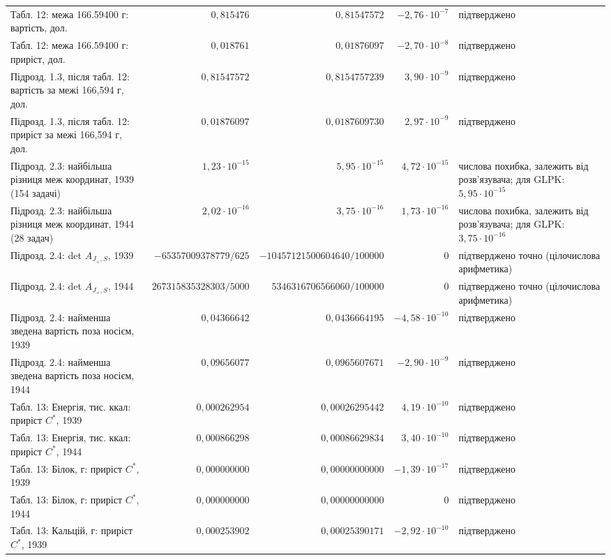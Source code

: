 {\begin{longtable}{>{\raggedright}p{4.3cm}rrr>{\raggedright\arraybackslash}p{2.3cm}}
Табл. 12: межа 166.59400 г: вартість, дол. & $0{,}815476$ & $0{,}81547572$ & $-2{,}76\cdot10^{-7}$ & підтверджено \\
Табл. 12: межа 166.59400 г: приріст, дол. & $0{,}018761$ & $0{,}01876097$ & $-2{,}70\cdot10^{-8}$ & підтверджено \\
Підрозд. 1.3, після табл. 12: вартість за межі 166{,}594 г, дол. & $0{,}81547572$ & $0{,}8154757239$ & $3{,}90\cdot10^{-9}$ & підтверджено \\
Підрозд. 1.3, після табл. 12: приріст за межі 166{,}594 г, дол. & $0{,}01876097$ & $0{,}0187609730$ & $2{,}97\cdot10^{-9}$ & підтверджено \\
Підрозд. 2.3: найбільша різниця меж координат, 1939 (154 задачі) & $1{,}23\cdot10^{-15}$ & $5{,}95\cdot10^{-15}$ & $4{,}72\cdot10^{-15}$ & числова похибка, залежить від розв’язувача; для GLPK: $5{,}95\cdot10^{-15}$ \\
Підрозд. 2.3: найбільша різниця меж координат, 1944 (28 задач) & $2{,}02\cdot10^{-16}$ & $3{,}75\cdot10^{-16}$ & $1{,}73\cdot10^{-16}$ & числова похибка, залежить від розв’язувача; для GLPK: $3{,}75\cdot10^{-16}$ \\
Підрозд. 2.4: det $A_{J_+,S}$, 1939 & $-65357009378779/625$ & $-10457121500604640/100000$ & $0$ & підтверджено точно (цілочислова арифметика) \\
Підрозд. 2.4: det $A_{J_+,S}$, 1944 & $267315835328303/5000$ & $5346316706566060/100000$ & $0$ & підтверджено точно (цілочислова арифметика) \\
Підрозд. 2.4: найменша зведена вартість поза носієм, 1939 & $0{,}04366642$ & $0{,}0436664195$ & $-4{,}58\cdot10^{-10}$ & підтверджено \\
Підрозд. 2.4: найменша зведена вартість поза носієм, 1944 & $0{,}09656077$ & $0{,}0965607671$ & $-2{,}90\cdot10^{-9}$ & підтверджено \\
Табл. 13: Енергія, тис. ккал: приріст $C^*$, 1939 & $0{,}000262954$ & $0{,}00026295442$ & $4{,}19\cdot10^{-10}$ & підтверджено \\
Табл. 13: Енергія, тис. ккал: приріст $C^*$, 1944 & $0{,}000866298$ & $0{,}00086629834$ & $3{,}40\cdot10^{-10}$ & підтверджено \\
Табл. 13: Білок, г: приріст $C^*$, 1939 & $0{,}000000000$ & $0{,}00000000000$ & $-1{,}39\cdot10^{-17}$ & підтверджено \\
Табл. 13: Білок, г: приріст $C^*$, 1944 & $0{,}000000000$ & $0{,}00000000000$ & $0$ & підтверджено \\
Табл. 13: Кальцій, г: приріст $C^*$, 1939 & $0{,}000253902$ & $0{,}00025390171$ & $-2{,}92\cdot10^{-10}$ & підтверджено \\

\end{longtable}}
